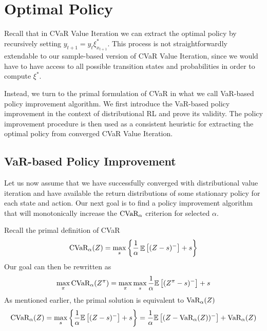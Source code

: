 

\section{Optimal Policy}\label{sec:qpolicy}

Recall that in CVaR Value Iteration we can extract the optimal policy by recursively setting $y_{t+1}=y_t \xi^*_{x_{t+1}}$. This process is not straightforwardly extendable to our sample-based version of CVaR Value Iteration, since we would have to have access to all possible transition states and probabilities in order to compute $\xi^*$.

Instead, we turn to the primal formulation of CVaR in what we call VaR-based policy improvement algorithm. We first introduce the VaR-based policy improvement in the context of distributional RL and prove its validity. The policy improvement procedure is then used as a consistent heuristic for extracting the optimal policy from converged CVaR Value Iteration.


\subsection{VaR-based Policy Improvement}

Let us now assume that we have successfully converged with distributional value iteration and have available the return distributions of some stationary policy for each state and action. Our next goal is to find a policy improvement algorithm that will monotonically increase the $\text{CVaR}_\alpha$ criterion for selected $\alpha$.

Recall the primal definition of CVaR 
\begin{equation*}
\text{CVaR}_\alpha(Z)=
\max_s\left\lbrace \dfrac{1}{\alpha}\mathop{\mathbb{E}}
\left[ (Z-s)^-\right] + s  \right\rbrace 
\end{equation*}
Our goal  can then be rewritten as
\begin{equation*}
\max_\pi \text{CVaR}_\alpha(Z^\pi) = \max_\pi \max_s \dfrac{1}{\alpha}\mathbb{E}
\left[ (Z^\pi-s)^-\right] + s
\end{equation*}
As mentioned earlier, the primal solution is equivalent to $\text{VaR}_\alpha(Z)$
\begin{equation*}
\text{CVaR}_\alpha(Z)=
\max_s\left\lbrace \dfrac{1}{\alpha}\mathbb{E}
\left[ (Z-s)^-\right] + s  \right\rbrace =\dfrac{1}{\alpha}\mathbb{E}
\left[ (Z - \text{VaR}_\alpha(Z))^-\right] + \text{VaR}_\alpha(Z) 
\end{equation*}

